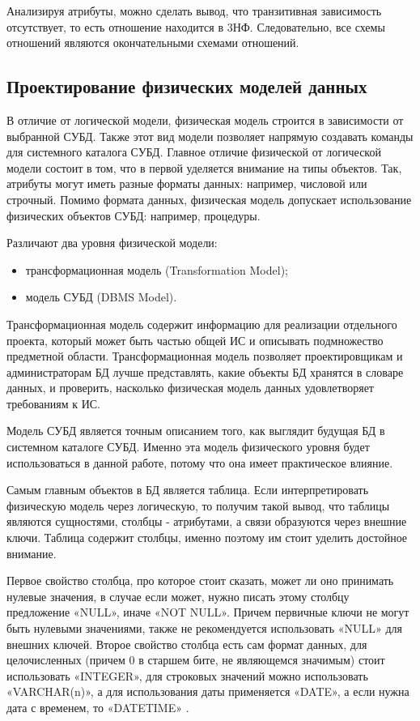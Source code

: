Анализируя атрибуты, можно сделать вывод, что транзитивная зависимость отсутствует, то есть отношение находится в 3НФ. Следовательно, все схемы отношений являются окончательными схемами отношений.

\subsection{Проектирование физических моделей данных}

В отличие от логической модели, физическая модель строится в зависимости от выбранной СУБД. Также этот вид модели позволяет напрямую создавать команды для системного каталога СУБД. Главное отличие физической от логической модели состоит в том, что в первой уделяется внимание на типы объектов. Так, атрибуты могут иметь разные форматы данных: например, числовой или строчный. Помимо формата данных, физическая модель допускает использование физических объектов СУБД: например, процедуры.

Различают два уровня физической модели:

\begin{itemize}
    \item трансформационная модель (Transformation Model);
    \item модель СУБД (DBMS Model).
\end{itemize}

Трансформационная модель содержит информацию для реализации отдельного проекта, который может быть частью общей ИС и описывать подмножество предметной области. Трансформационная модель позволяет проектировщикам и администраторам БД лучше представлять, какие объекты БД хранятся в словаре данных, и проверить, насколько физическая модель данных удовлетворяет требованиям к ИС.

Модель СУБД является точным описанием того, как выглядит будущая БД в системном каталоге СУБД. Именно эта модель физического уровня будет использоваться в данной работе, потому что она имеет практическое влияние.

Самым главным объектов в БД является таблица. Если интерпретировать физическую модель через логическую, то получим такой вывод, что таблицы являются сущностями, столбцы - атрибутами, а связи образуются через внешние ключи. Таблица содержит столбцы, именно поэтому им стоит уделить достойное внимание.

Первое свойство столбца, про которое стоит сказать, может ли оно принимать нулевые значения, в случае если может, нужно писать этому столбцу предложение «NULL», иначе «NOT NULL». Причем первичные ключи не могут быть нулевыми значениями, также не рекомендуется использовать «NULL» для внешних ключей. Второе свойство столбца есть сам формат данных, для целочисленных (причем 0 в старшем бите, не являющемся значимым) стоит использовать «INTEGER», для строковых значений можно использовать «VARCHAR(n)», а для использования даты применяется «DATE», а если нужна дата с временем, то «DATETIME» \cite{online5}.




